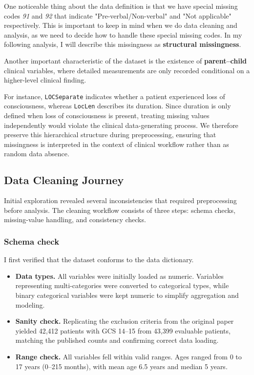 \documentclass[10pt,letterpaper]{article}
\begin{document}
One noticeable thing about the data definition is that we have special missing codes \emph{91} and \emph{92} that indicate "Pre-verbal/Non-verbal" and "Not applicable" respectively. This is important to keep in mind when we do data cleaning and analysis, as we need to decide how to handle these special missing codes. In my following analysis, I will describe this missingness as \textbf{structural missingness}.

Another important characteristic of the dataset is the existence of \textbf{parent–child} clinical variables, where detailed measurements are only recorded conditional on a higher-level clinical finding. 

For instance, \texttt{LOCSeparate} indicates whether a patient experienced loss of consciousness, whereas \texttt{LocLen} describes its duration. Since duration is only defined when loss of consciousness is present, treating missing values independently would violate the clinical data-generating process. We therefore preserve this hierarchical structure during preprocessing, ensuring that missingness is interpreted in the context of clinical workflow rather than as random data absence.


\subsection{Data Cleaning Journey}

Initial exploration revealed several inconsistencies that required preprocessing before analysis. 
The cleaning workflow consists of three steps: schema checks, missing-value handling, and consistency checks.

\subsubsection{Schema check}

I first verified that the dataset conforms to the data dictionary.

\begin{itemize}
\item \textbf{Data types.} All variables were initially loaded as numeric. Variables representing multi-categories were converted to categorical types, while binary categorical variables were kept numeric to simplify aggregation and modeling.

\item \textbf{Sanity check.} Replicating the exclusion criteria from the original paper yielded 42,412 patients with GCS 14–15 from 43,399 evaluable patients, matching the published counts and confirming correct data loading.

\item \textbf{Range check.} All variables fell within valid ranges. Ages ranged from 0 to 17 years (0–215 months), with mean age 6.5 years and median 5 years.
\end{itemize}
\end{document}
